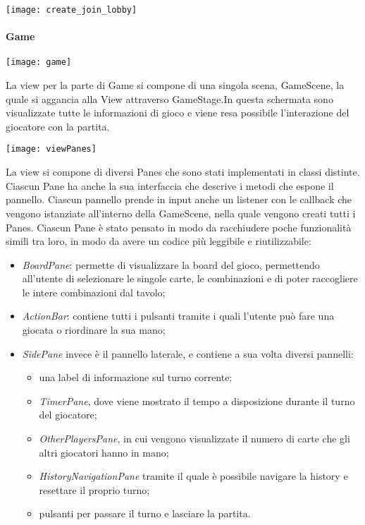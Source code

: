 \begin{center}
    \texttt{[image: create\_join\_lobby]}
\end{center}
\newpage
\paragraph{Game}
\begin{center}
    \texttt{[image: game]}
\end{center}
La view per la parte di Game si compone di una singola scena, GameScene, la quale si aggancia alla View attraverso GameStage.In questa schermata sono visualizzate tutte le informazioni di gioco e viene resa possibile l’interazione del giocatore con la partita. \newline
\begin{center}
    \texttt{[image: viewPanes]}
\end{center}
La view si compone di diversi Panes che sono stati implementati in classi distinte. Ciascun Pane ha anche la sua interfaccia che descrive i metodi che espone il pannello.
Ciascun pannello prende in input anche un listener con le callback che vengono istanziate all’interno della GameScene, nella quale vengono creati tutti i Panes.
\newline \newline
Ciascun Pane è stato pensato in modo da racchiudere poche funzionalità simili tra loro, in modo da avere un codice più leggibile e riutilizzabile:
\begin{itemize}
    \item \textit{BoardPane}: permette di visualizzare la board del gioco, permettendo all’utente di selezionare le singole carte, le combinazioni e di poter raccogliere le intere combinazioni dal tavolo;
    \item \textit{ActionBar}: contiene tutti i pulsanti tramite i quali l’utente può fare una giocata o riordinare la sua mano;
    \item \textit{SidePane} invece è il pannello laterale, e contiene a sua volta diversi pannelli:
    \begin{itemize}
        \item una label di informazione sul turno corrente;
        \item \textit{TimerPane}, dove viene mostrato il tempo a disposizione durante il turno del giocatore;
        \item \textit{OtherPlayersPane}, in cui vengono visualizzate il numero di carte che gli altri giocatori hanno in mano;
        \item \textit{HistoryNavigationPane} tramite il quale è possibile navigare la history e resettare il proprio turno;
        \item pulsanti per passare il turno e lasciare la partita.
    \end{itemize}
\end{itemize}
